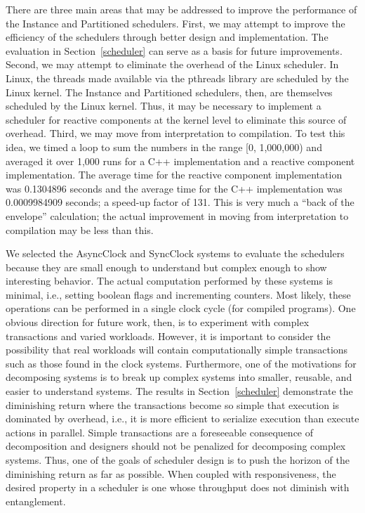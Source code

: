 There are three main areas that may be addressed to improve the performance of the Instance and Partitioned schedulers.
First, we may attempt to improve the efficiency of the schedulers through better design and implementation.
The evaluation in Section~\ref{scheduler} can serve as a basis for future improvements.
Second, we may attempt to eliminate the overhead of the Linux scheduler.
In Linux, the threads made available via the pthreads library are scheduled by the Linux kernel.
The Instance and Partitioned schedulers, then, are themselves scheduled by the Linux kernel.
Thus, it may be necessary to implement a scheduler for reactive components at the kernel level to eliminate this source of overhead.
Third, we may move from interpretation to compilation.
To test this idea, we timed a loop to sum the numbers in the range [0, 1,000,000) and averaged it over 1,000 runs for a C++ implementation and a reactive component implementation.
The average time for the reactive component implementation was 0.1304896 seconds and the average time for the C++ implementation was 0.0009984909 seconds; a speed-up factor of 131.
This is very much a ``back of the envelope'' calculation; the actual improvement in moving from interpretation to compilation may be less than this.

We selected the AsyncClock and SyncClock systems to evaluate the schedulers because they are small enough to understand but complex enough to show interesting behavior.
The actual computation performed by these systems is minimal, i.e., setting boolean flags and incrementing counters.
Most likely, these operations can be performed in a single clock cycle (for compiled programs).
One obvious direction for future work, then, is to experiment with complex transactions and varied workloads.
However, it is important to consider the possibility that real workloads will contain computationally simple transactions such as those found in the clock systems.
Furthermore, one of the motivations for decomposing systems is to break up complex systems into smaller, reusable, and easier to understand systems.
The results in Section~\ref{scheduler} demonstrate the diminishing return where the transactions become so simple that execution is dominated by overhead, i.e., it is more efficient to serialize execution than execute actions in parallel.
Simple transactions are a foreseeable consequence of decomposition and designers should not be penalized for decomposing complex systems.
Thus, one of the goals of scheduler design is to push the horizon of the diminishing return as far as possible.
When coupled with responsiveness, the desired property in a scheduler is one whose throughput does not diminish with entanglement.

